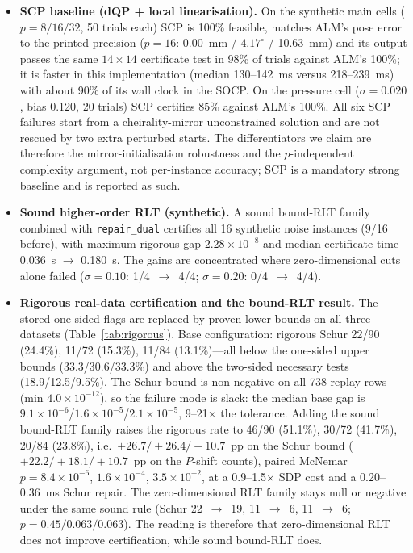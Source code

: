 \begin{itemize}
\item \textbf{SCP baseline (dQP + local linearisation).} On the synthetic main cells ($p=8/16/32$, 50 trials each) SCP is 100\% feasible, matches ALM's pose error to the printed precision ($p=16$: 0.00~mm / $4.17^\circ$ / 10.63~mm) and its output passes the same $14\times14$ certificate test in 98\% of trials against ALM's 100\%; it is faster in this implementation (median 130--142~ms versus 218--239~ms) with about 90\% of its wall clock in the SOCP. On the pressure cell ($\sigma=0.020$, bias 0.120, 20 trials) SCP certifies 85\% against ALM's 100\%. All six SCP failures start from a cheirality-mirror unconstrained solution and are not rescued by two extra perturbed starts. The differentiators we claim are therefore the mirror-initialisation robustness and the $p$-independent complexity argument, not per-instance accuracy; SCP is a mandatory strong baseline and is reported as such.
\item \textbf{Sound higher-order RLT (synthetic).} A sound bound-RLT family combined with \texttt{repair\_dual} certifies all 16 synthetic noise instances (9/16 before), with maximum rigorous gap $2.28\times10^{-8}$ and median certificate time 0.036~s $\to$ 0.180~s. The gains are concentrated where zero-dimensional cuts alone failed ($\sigma=0.10$: 1/4~$\to$~4/4; $\sigma=0.20$: 0/4~$\to$~4/4).
\item \textbf{Rigorous real-data certification and the bound-RLT result.} The stored one-sided flags are replaced by proven lower bounds on all three datasets (Table~\ref{tab:rigorous}). Base configuration: rigorous Schur 22/90 (24.4\%), 11/72 (15.3\%), 11/84 (13.1\%)---all below the one-sided upper bounds (33.3/30.6/33.3\%) and above the two-sided necessary tests (18.9/12.5/9.5\%). The Schur bound is non-negative on all 738 replay rows (min $4.0\times10^{-12}$), so the failure mode is slack: the median base gap is $9.1\times10^{-6}$/$1.6\times10^{-5}$/$2.1\times10^{-5}$, 9--21$\times$ the tolerance. Adding the sound bound-RLT family raises the rigorous rate to 46/90 (51.1\%), 30/72 (41.7\%), 20/84 (23.8\%), i.e.\ $+26.7/+26.4/+10.7$~pp on the Schur bound ($+22.2/+18.1/+10.7$~pp on the $P$-shift counts), paired McNemar $p=8.4\times10^{-6}$, $1.6\times10^{-4}$, $3.5\times10^{-2}$, at a 0.9--1.5$\times$ SDP cost and a 0.20--0.36~ms Schur repair. The zero-dimensional RLT family stays null or negative under the same sound rule (Schur 22~$\to$~19, 11~$\to$~6, 11~$\to$~6; $p=0.45/0.063/0.063$). The reading is therefore that zero-dimensional RLT does not improve certification, while sound bound-RLT does.
\end{itemize}

